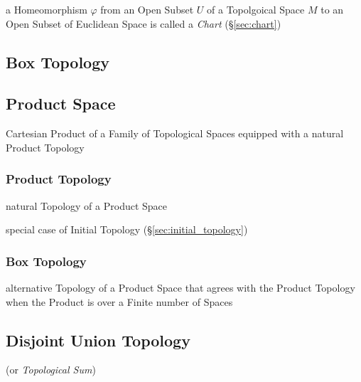 a Homeomorphism $\varphi$ from an Open Subset $U$ of a Topolgoical Space $M$ to
an Open Subset of Euclidean Space is called a \emph{Chart} (\S\ref{sec:chart})



\subsection{Box Topology}\label{sec:box_topology}

\subsection{Product Space}\label{sec:product_space}

Cartesian Product of a Family of Topological Spaces equipped with a natural
Product Topology



\subsubsection{Product Topology}\label{sec:product_topology}

natural Topology of a Product Space

special case of Initial Topology (\S\ref{sec:initial_topology})



\subsubsection{Box Topology}\label{sec:box_topology}

alternative Topology of a Product Space that agrees with the Product Topology
when the Product is over a Finite number of Spaces



\subsection{Disjoint Union Topology}\label{sec:disjoint_union_topology}

(or \emph{Topological Sum})

